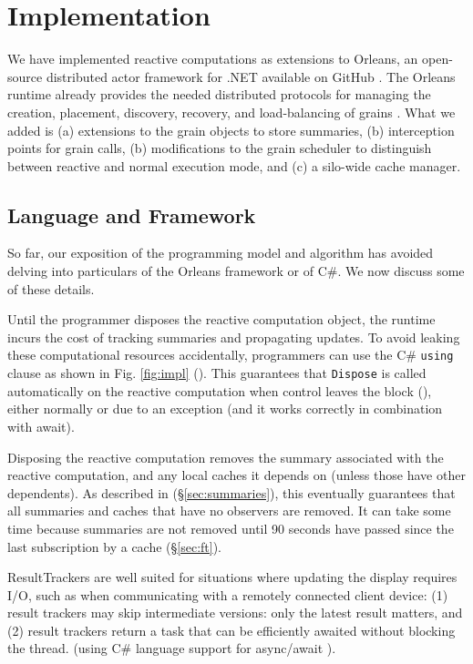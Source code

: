\section{Implementation} \label{sec:implementation}

We have implemented reactive computations as extensions to Orleans, an open-source distributed actor framework for .NET available on GitHub \cite{orleans}. The Orleans runtime already provides the needed distributed protocols for managing the creation, placement, discovery, recovery, and load-balancing of grains \cite{orleans-socc,orleanstr}. What we added is (a) extensions to the grain objects to store summaries, (b) interception points for grain calls, (b) modifications to the grain scheduler to distinguish between reactive and normal execution mode, and (c) a silo-wide cache manager. 

\subsection{Language and Framework}

So far, our exposition of the programming model and algorithm has avoided delving into particulars of the Orleans framework or of C\#. We now discuss some of these details.

 Until the programmer disposes the reactive computation object, the runtime incurs the cost of tracking summaries and propagating updates. To avoid leaking these computational resources accidentally,  programmers can use the C\# \lstinline|using| clause as shown in Fig. \ref{fig:impl} (). This guarantees that \lstinline|Dispose| is called automatically on the reactive computation when control leaves the block (), either normally or due to an exception (and it works correctly in combination with \textsf{await}). 

Disposing the reactive computation removes the summary associated with the reactive computation, and any local caches it depends on (unless those have other dependents). As described in  (\S\ref{sec:summaries}), this eventually guarantees that all summaries and caches that have no observers are removed. It can take some time because summaries are not removed until 90 seconds have passed since the last subscription by a cache (\S\ref{sec:ft}). 

 ResultTrackers are well suited for situations where updating the display requires I/O, such as when communicating with a remotely connected client device:   (1) result trackers may skip intermediate versions: only the latest result matters, and (2) result trackers return a task that can be efficiently awaited without blocking the thread.  (using C\# language support for async/await \cite{Bierman2012}). 

